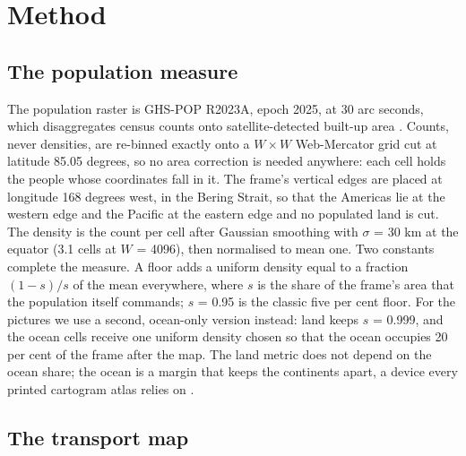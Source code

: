 \section{Method}\label{method}

\subsection{The population measure}\label{the-population-measure}

The population raster is GHS-POP R2023A, epoch 2025, at 30 arc seconds,
which disaggregates census counts onto satellite-detected built-up area
\citep{ghspop2023}. Counts, never densities, are re-binned exactly onto a
\(W\times W\) Web-Mercator grid cut at latitude 85.05 degrees, so no
area correction is needed anywhere: each cell holds the people whose
coordinates fall in it. The frame's vertical edges are placed at
longitude 168 degrees west, in the Bering Strait, so that the Americas
lie at the western edge and the Pacific at the eastern edge and no
populated land is cut. The density is the count per cell after Gaussian
smoothing with \(\sigma\) = 30 km at the equator (3.1 cells at \(W\) =
4096), then normalised to mean one. Two constants complete the measure.
A floor adds a uniform density equal to a fraction \((1-s)/s\) of the
mean everywhere, where \(s\) is the share of the frame's area that the
population itself commands; \(s\) = 0.95 is the classic five per cent
floor. For the pictures we use a second, ocean-only version instead:
land keeps \(s\) = 0.999, and the ocean cells receive one uniform
density chosen so that the ocean occupies 20 per cent of the frame after
the map. The land metric does not depend on the ocean share; the ocean
is a margin that keeps the continents apart, a device every printed
cartogram atlas relies on \citep{hennig2013}.

\subsection{The transport map}\label{the-transport-map}

